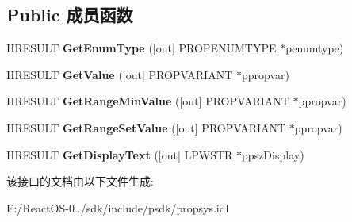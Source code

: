 \subsection*{Public 成员函数}
\begin{DoxyCompactItemize}
\item 
\mbox{\label{interface_i_property_enum_type_a4ed288923f5d1580008b4f893ed04947}} 
H\+R\+E\+S\+U\+LT {\bfseries Get\+Enum\+Type} (\mbox{[}out\mbox{]} P\+R\+O\+P\+E\+N\+U\+M\+T\+Y\+PE $\ast$penumtype)
\item 
\mbox{\label{interface_i_property_enum_type_a0442782daeb853cc9a0a3f6e5fd14a92}} 
H\+R\+E\+S\+U\+LT {\bfseries Get\+Value} (\mbox{[}out\mbox{]} P\+R\+O\+P\+V\+A\+R\+I\+A\+NT $\ast$ppropvar)
\item 
\mbox{\label{interface_i_property_enum_type_a4481c6a585f5bb530d950ecfee88aa91}} 
H\+R\+E\+S\+U\+LT {\bfseries Get\+Range\+Min\+Value} (\mbox{[}out\mbox{]} P\+R\+O\+P\+V\+A\+R\+I\+A\+NT $\ast$ppropvar)
\item 
\mbox{\label{interface_i_property_enum_type_a7a826618160e5805509808e718acc476}} 
H\+R\+E\+S\+U\+LT {\bfseries Get\+Range\+Set\+Value} (\mbox{[}out\mbox{]} P\+R\+O\+P\+V\+A\+R\+I\+A\+NT $\ast$ppropvar)
\item 
\mbox{\label{interface_i_property_enum_type_ae8215fb00a4b49441c9f2a7ddf22e82c}} 
H\+R\+E\+S\+U\+LT {\bfseries Get\+Display\+Text} (\mbox{[}out\mbox{]} L\+P\+W\+S\+TR $\ast$ppsz\+Display)
\end{DoxyCompactItemize}


该接口的文档由以下文件生成\+:\begin{DoxyCompactItemize}
\item 
E\+:/\+React\+O\+S-\/0../sdk/include/psdk/propsys.\+idl\end{DoxyCompactItemize}
